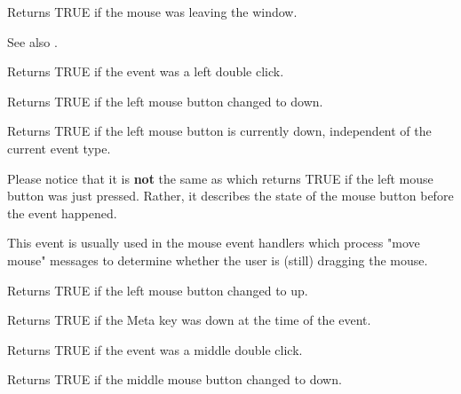 
Returns TRUE if the mouse was leaving the window.

See also .



Returns TRUE if the event was a left double click.

\label{wxmouseeventleftdown}


Returns TRUE if the left mouse button changed to down.

\label{wxmouseeventleftisdown}


Returns TRUE if the left mouse button is currently down, independent
of the current event type.

Please notice that it is {\bf not} the same as
 which returns TRUE if the left mouse
button was just pressed. Rather, it describes the state of the mouse button
before the event happened.

This event is usually used in the mouse event handlers which process "move
mouse" messages to determine whether the user is (still) dragging the mouse.



Returns TRUE if the left mouse button changed to up.



Returns TRUE if the Meta key was down at the time of the event.



Returns TRUE if the event was a middle double click.



Returns TRUE if the middle mouse button changed to down.

